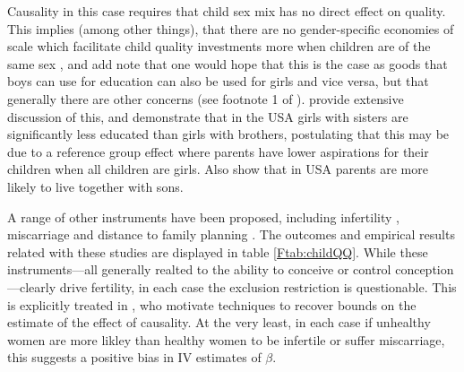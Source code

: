 Causality in this case requires that child sex mix has no direct effect on 
quality.  This implies (among other things), that there are no gender-specific 
economies of scale which facilitate child quality investments more when children
are of the same sex \citep{ButcherCase1994}, and add note that one would hope 
that this is the case as goods that boys can use for education can also be used 
for girls and vice versa, but that generally there are other concerns (see 
footnote 1 of \citet{RosenzweigZhang2009}). \citet{ButcherCase1994} provide 
extensive discussion of this, and demonstrate that in the USA girls with sisters
are significantly less educated than girls with brothers, postulating that this
may be due to a reference group effect where parents have lower aspirations for
their children when all children are girls. Also \citet{DahlMoretti2008} show
that in USA parents are more likely to live together with sons.

A range of other instruments have been proposed, including infertility
\citep{Bougmaetal2015}, miscarriage \citep{Hotzetal1997,Marlani2008,Miller2009}
and distance to family planning \citep{DangRogers2013}. The outcomes and 
empirical results related with these studies are displayed in table 
\ref{Ftab:childQQ}.  While these instruments---all generally realted to the 
ability to conceive or control conception---clearly drive fertility, in each 
case the exclusion restriction is questionable.  This is explicitly treated in
\citet{Hotzetal1997}, who motivate techniques to recover bounds on the estimate
of the effect of causality.  At the very least, in each case if unhealthy
women are more likley than healthy women to be infertile or suffer miscarriage,
this suggests a positive bias in IV estimates of $\beta$.



